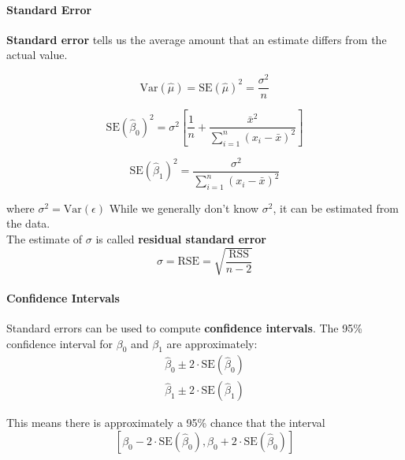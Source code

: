         \paragraph{Standard Error\\}
        \textbf{Standard error} tells us the average amount that an estimate differs from the actual value.
        
        \begin{equation*} \tag{3.7}
            \text{Var}(\hat \mu) = \text{SE}(\hat \mu)^2 = \frac{\sigma^2}{n}
        \end{equation*}
        
        
        \begin{equation*} \tag{3.8}
            \text{SE}(\hat \beta_0)^2 = \sigma^2 \left[ \frac{1}{n} + \frac{\bar x ^2}{\sum_{i=1}^n (x_i - \bar x)^2} \right]
        \end{equation*}
        
        \begin{equation*} \tag{also 3.8}
            \text{SE}(\hat \beta_1)^2 = \frac{\sigma^2}{\sum_{i=1}^n (x_i - \bar x)^2}
        \end{equation*}
        
        where \(\sigma^2 = \text{Var}(\epsilon)\) While we generally don't know \(\sigma^2\), it can be estimated from the data.\\
        The estimate of \(\sigma\) is called \textbf{residual standard error}
        \begin{equation*}
            \sigma = \text{RSE} = \sqrt{\frac{\text{RSS}}{n-2}}
        \end{equation*}
        
        \paragraph{Confidence Intervals\\}
         Standard errors can be used to compute    \textbf{confidence intervals}. The 95\% confidence interval for
        \(\beta_0\) and \(\beta_1\) are approximately: 
        \begin{gather*}
            \hat \beta_0 \pm 2 \cdot \text{SE}(\hat \beta_0) \tag{3.11}\\
            \hat \beta_1 \pm 2 \cdot \text{SE}(\hat \beta_1)
        \end{gather*}
        
        This means there is approximately a 95\% chance that the interval
        \begin{equation*} \tag{almost 3.10}
            \left[\beta_0 - 2 \cdot \text{SE}(\hat \beta_0), \beta_0 + 2 \cdot \text{SE}(\hat \beta_0)\right]            
        \end{equation*}
        
